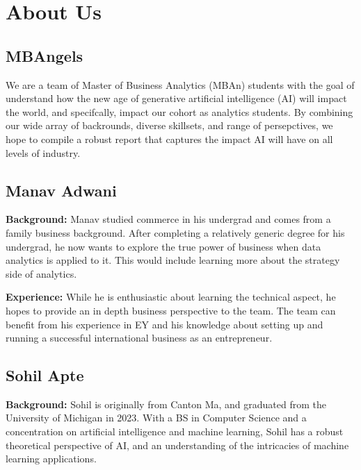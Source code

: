 \documentclass[
]{book}
\begin{document}
\hypertarget{about-us}{%
\chapter{About Us}\label{about-us}}

\hypertarget{mbangels}{%
\section{MBAngels}\label{mbangels}}

We are a team of Master of Business Analytics (MBAn) students with the goal of understand how the new age of generative artificial intelligence (AI) will impact the world, and specifcally, impact our cohort as analytics students. By combining our wide array of backrounds, diverse skillsets, and range of persepctives, we hope to compile a robust report that captures the impact AI will have on all levels of industry.

\hypertarget{manav-adwani}{%
\section{Manav Adwani}\label{manav-adwani}}

\textbf{Background:}
Manav studied commerce in his undergrad and comes from a family business background. After completing a relatively generic degree for his undergrad, he now wants to explore the true power of business when data analytics is applied to it. This would include learning more about the strategy side of analytics.

\textbf{Experience:}
While he is enthusiastic about learning the technical aspect, he hopes to provide an in depth business perspective to the team. The team can benefit from his experience in EY and his knowledge about setting up and running a successful international business as an entrepreneur.

\hypertarget{sohil-apte}{%
\section{Sohil Apte}\label{sohil-apte}}

\textbf{Background:}
Sohil is originally from Canton Ma, and graduated from the University of Michigan in 2023. With a BS in Computer Science and a concentration on artificial intelligence and machine learning, Sohil has a robust theoretical perspective of AI, and an understanding of the intricacies of machine learning applications.
\end{document}

